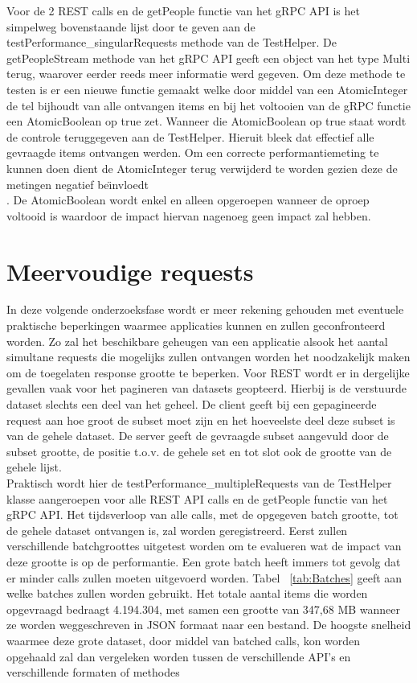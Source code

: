 Voor de 2 REST calls en de getPeople functie van het gRPC API is het simpelweg bovenstaande lijst door te geven aan de testPerformance\_singularRequests methode
van de TestHelper. De getPeopleStream methode van het gRPC API geeft een object van het type Multi terug, waarover eerder reeds meer informatie werd gegeven.
Om deze methode te testen is er een nieuwe functie gemaakt welke door middel van een AtomicInteger de tel bijhoudt van alle ontvangen items en bij het voltooien van
de gRPC functie een AtomicBoolean op true zet. Wanneer die AtomicBoolean op true staat wordt de controle teruggegeven aan de TestHelper. Hieruit bleek dat effectief
alle gevraagde items ontvangen werden. Om een correcte performantiemeting te kunnen doen dient de AtomicInteger terug verwijderd te worden gezien deze de metingen
negatief be\"{\i}nvloedt\"\\. De AtomicBoolean wordt enkel en alleen opgeroepen wanneer de oproep voltooid is waardoor de impact hiervan nagenoeg geen impact zal hebben.

\section{Meervoudige requests}

In deze volgende onderzoeksfase wordt er meer rekening gehouden met eventuele praktische beperkingen waarmee applicaties kunnen en zullen geconfronteerd worden.
Zo zal het beschikbare geheugen van een applicatie alsook het aantal simultane requests die mogelijks zullen ontvangen worden het noodzakelijk maken om
de toegelaten response grootte te beperken. Voor REST wordt er in dergelijke gevallen vaak voor het pagineren van datasets geopteerd.
Hierbij is de verstuurde dataset slechts een deel van het geheel. De client geeft bij een gepagineerde request aan hoe groot de subset moet zijn
en het hoeveelste deel deze subset is van de gehele dataset. De server geeft de gevraagde subset aangevuld door de subset grootte, de positie t.o.v. de gehele set
en tot slot ook de grootte van de gehele lijst.\\

Praktisch wordt hier de testPerformance\_multipleRequests van de TestHelper klasse aangeroepen voor alle REST API calls en de getPeople functie van het gRPC API.
Het tijdsverloop van alle calls, met de opgegeven batch grootte, tot de gehele dataset ontvangen is, zal worden geregistreerd. Eerst zullen verschillende batchgroottes
uitgetest worden om te evalueren wat de impact van deze grootte is op de performantie. Een grote batch heeft immers tot gevolg dat er minder calls zullen moeten uitgevoerd worden.\newline
Tabel ~\ref{tab:Batches} geeft aan welke batches zullen worden gebruikt. Het totale aantal items die worden opgevraagd bedraagt 4.194.304, met samen een grootte
van 347,68 MB wanneer ze worden weggeschreven in JSON formaat naar een bestand. De hoogste snelheid waarmee deze grote dataset, door middel van batched calls, kon worden
opgehaald zal dan vergeleken worden tussen de verschillende API's en verschillende formaten of methodes\\

